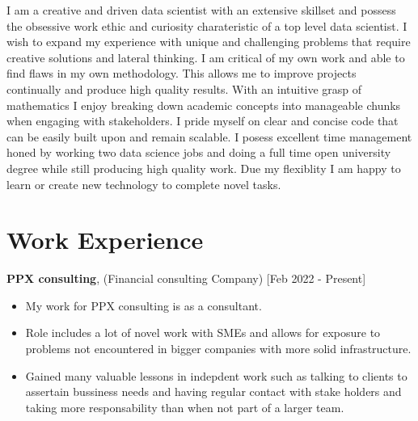 \documentclass[10pt]{article}
\begin{document}
{I am a creative and driven data scientist with an extensive skillset and possess the obsessive work ethic and curiosity charateristic of a top level data scientist.
I wish to expand my experience with unique and challenging problems that require creative solutions
and lateral thinking. 
\newline
I am critical of my own work and able to find flaws in my own methodology. This allows me to
improve projects continually and produce high quality results.
With an intuitive grasp of mathematics I enjoy breaking down academic concepts into manageable chunks when engaging with stakeholders. 
\newline
I pride myself on clear and concise code that can be easily built upon and remain scalable. 
\newline
I posess excellent time management honed by working two data science jobs and doing a full time open
university degree while still producing high quality work.
Due my flexiblity I am happy to learn or create new technology to complete novel tasks.





\section*{\bf Work Experience}


{\bf PPX consulting}, (Financial consulting Company) [Feb 2022 - Present]
\begin{itemize}
\setlength{\itemsep}{0.10ex}
\item My work for PPX consulting is as a consultant. 
\item Role includes a lot of novel work with SMEs and allows for exposure to problems not encountered in bigger companies with more solid infrastructure. 
\item Gained many valuable lessons in indepdent work such as talking to clients to assertain
bussiness needs and having regular contact with stake holders and taking more responsability than when not part of a larger team.

\end{itemize}

}
\end{document}
